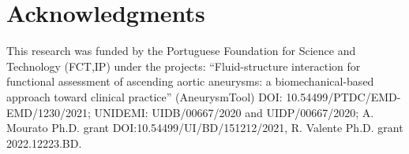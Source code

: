 \documentclass[a4paper,fleqn]{cas-sc}
\begin{document}
\section*{Acknowledgments}
This research was funded by the Portuguese Foundation for Science and Technology (FCT,IP) under the projects: “Fluid-structure interaction for functional assessment of ascending aortic aneurysms: a biomechanical-based approach toward clinical practice” (AneurysmTool) DOI: 10.54499/PTDC/EMD-EMD/1230/2021; UNIDEMI: UIDB/00667/2020 and UIDP/00667/2020; A. Mourato Ph.D. grant DOI:10.54499/UI/BD/151212/2021, R. Valente Ph.D. grant 2022.12223.BD.

\printcredits


%


\end{document}

